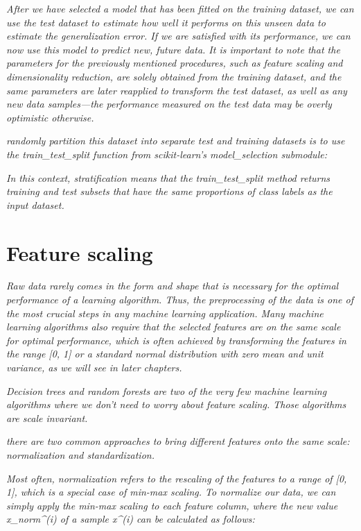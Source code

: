 \textit{After we have selected a model that has been fitted on the training dataset, we can use the test dataset to estimate how well it performs on this unseen data to estimate the generalization error. If we are satisfied with its performance, we can now use this model to predict new, future data. It is important to note that the parameters for the previously mentioned procedures, such as feature scaling and dimensionality reduction, are solely obtained from the training dataset, and the same parameters are later reapplied to transform the test dataset, as well as any new data samples—the performance measured on the test data may be overly optimistic otherwise.}

\textit{randomly partition this dataset into separate test and training datasets is to use the train_test_split function from scikit-learn's model_selection submodule:}

\textit{In this context, stratification means that the train\_test\_split method returns training and test subsets that have the same proportions of class labels as the input dataset.}

\section{Feature scaling} \label{sec:feature_scaling}

\textit{Raw data rarely comes in the form and shape that is necessary for the optimal performance of a learning algorithm. Thus, the preprocessing of the data is one of the most crucial steps in any machine learning application. Many machine learning algorithms also require that the selected features are on the same scale for optimal performance, which is often achieved by transforming the features in the range [0, 1] or a standard normal distribution with zero mean and unit variance, as we will see in later chapters.}

\textit{Decision trees and random forests are two of the very few machine learning algorithms where we don't need to worry about feature scaling. Those algorithms are scale invariant.}

\textit{there are two common approaches to bring different features onto the same scale: normalization and standardization.}

\textit{Most often, normalization refers to the rescaling of the features to a range of [0, 1], which is a special case of min-max scaling. To normalize our data, we can simply apply the min-max scaling to each feature column, where the new value x_{norm}^{(i)} of a sample x^{(i)} can be calculated as follows:}


